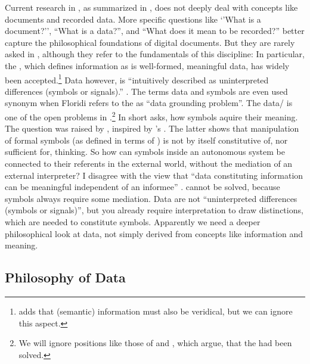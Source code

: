 
Current research in , as summarized in \textcite{Floridi2009}, does
not deeply deal with concepts like documents and recorded data. More specific
questions like `'What is a document?'', ``What is a data?'', and ``What does it
mean to be recorded?'' better capture the philosophical foundations of digital
documents. But they are rarely asked in , although they refer to the
fundamentals of this discipline: In particular, the , which defines information as is well-formed, meaningful
data, has widely been accepted.\footnote{\textcite{Floridi2005} adds that
(semantic) information must also be veridical, but we can ignore this aspect.}
Data however, is ``intuitively described as uninterpreted differences (symbols
or signals).'' \cite{Floridi2009}. The terms data and symbols are even used
synonym when Floridi refers to the   as
``data grounding problem''. The data/ is one of
the open problems in 
\cite{Harnad2007,Taddeo2005}.\footnote{ We will ignore positions like those of
\textcite{Steels2007} and \textcite{Taddeo2007}, which argue, that the
 had been solved.} In short  asks, how
symbols aquire their meaning. The question was raised by
, inspired by 's . The latter shows that manipulation of formal symbols (as
defined in terms of ) is not by itself constitutive of,
nor sufficient for, thinking. So how can symbols inside an autonomous system be
connected to their referents in the external world, without the mediation of an
external interpreter? I disagree with the view that ``data constituting
information can be meaningful independent of an informee'' \cite[p.
22]{Floridi2010}.  cannot be solved, because symbols always require
some mediation. Data are not ``uninterpreted differences (symbols or
signals)'', but you already require interpretation to draw distinctions, which
are needed to constitute symbols. Apparently we need a deeper philosophical
look at data, not simply derived from concepts like information and meaning.

\subsection{Philosophy of Data}
\label{sec:philofdata}

